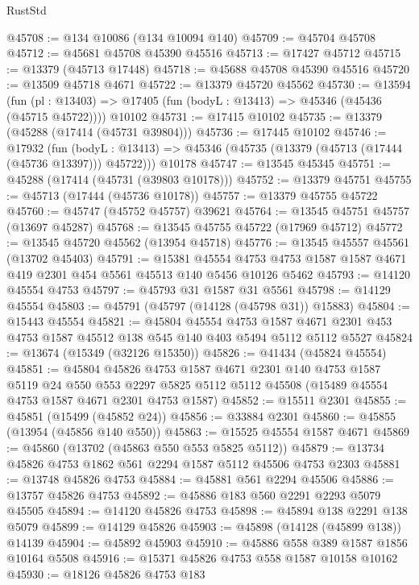 \begin{lexlean}{RustStd}
\begin{coremodule}
@45708 := @134 @10086 (@134 @10094 @140)
@45709 := @45704 @45708
@45712 := @45681 @45708 @45390 @45516
@45713 := @17427 @45712
@45715 := @13379 (@45713 @17448)
@45718 := @45688 @45708 @45390 @45516
@45720 := @13509 @45718 @4671
@45722 := @13379 @45720 @45562
@45730 := @13594
    (fun (pl : @13403) => @17405 (fun (bodyL : @13413) => @45346 (@45436 (@45715 @45722))))
    @10102
@45731 := @17415 @10102
@45735 := @13379 (@45288 (@17414 (@45731 @39804)))
@45736 := @17445 @10102
@45746 := @17932
    (fun (bodyL : @13413) => @45346 (@45735 (@13379 (@45713 (@17444 (@45736 @13397))) @45722)))
    @10178
@45747 := @13545 @45345
@45751 := @45288 (@17414 (@45731 (@39803 @10178)))
@45752 := @13379 @45751
@45755 := @45713 (@17444 (@45736 @10178))
@45757 := @13379 @45755 @45722
@45760 := @45747 (@45752 @45757) @39621
@45764 := @13545 @45751 @45757 (@13697 @45287)
@45768 := @13545 @45755 @45722 (@17969 @45712)
@45772 := @13545 @45720 @45562 (@13954 @45718)
@45776 := @13545 @45557 @45561 (@13702 @45403)
@45791 := @15381
    @45554
    @4753
    @4753
    @1587
    @1587
    @4671
    @419
    @2301
    @454
    @5561
    @45513
    @140
    @5456
    @10126
    @5462
@45793 := @14120 @45554 @4753
@45797 := @45793 @31 @1587 @31 @5561
@45798 := @14129 @45554
@45803 := @45791 (@45797 (@14128 (@45798 @31)) @15883)
@45804 := @15443 @45554
@45821 := @45804
    @45554
    @4753
    @1587
    @4671
    @2301
    @453
    @4753
    @1587
    @45512
    @138
    @545
    @140
    @403
    @5494
    @5112
    @5112
    @5527
@45824 := @13674 (@15349 (@32126 @15350))
@45826 := @41434 (@45824 @45554)
@45851 := @45804
    @45826
    @4753
    @1587
    @4671
    @2301
    @140
    @4753
    @1587
    @5119
    @24
    @550
    @553
    @2297
    @5825
    @5112
    @5112
    @45508
    (@15489 @45554 @4753 @1587 @4671 @2301 @4753 @1587)
@45852 := @15511 @2301
@45855 := @45851 (@15499 (@45852 @24))
@45856 := @33884 @2301
@45860 := @45855 (@13954 (@45856 @140 @550))
@45863 := @15525 @45554 @1587 @4671
@45869 := @45860 (@13702 (@45863 @550 @553 @5825 @5112))
@45879 := @13734 @45826 @4753 @1862 @561 @2294 @1587 @5112 @45506 @4753 @2303
@45881 := @13748 @45826 @4753
@45884 := @45881 @561 @2294 @45506
@45886 := @13757 @45826 @4753
@45892 := @45886 @183 @560 @2291 @2293 @5079 @45505
@45894 := @14120 @45826 @4753
@45898 := @45894 @138 @2291 @138 @5079
@45899 := @14129 @45826
@45903 := @45898 (@14128 (@45899 @138)) @14139
@45904 := @45892 @45903
@45910 := @45886 @558 @389 @1587 @1856 @10164 @5508
@45916 := @15371 @45826 @4753 @558 @1587 @10158 @10162
@45930 := @18126
    @45826
    @4753
    @183

\end{coremodule}
\end{lexlean}
